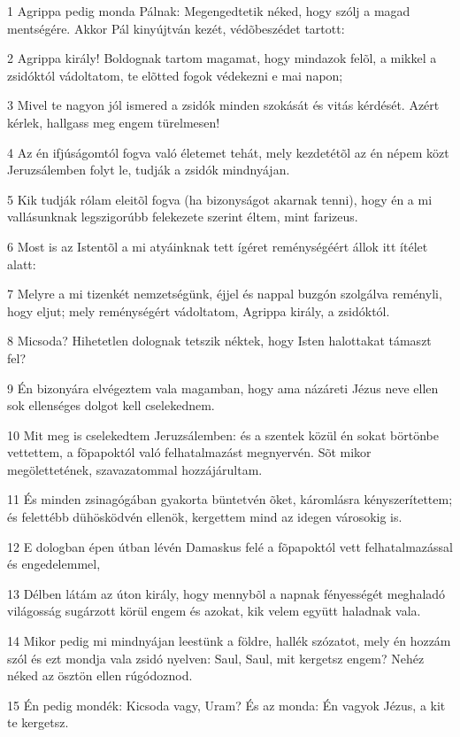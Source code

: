\par 1 Agrippa pedig monda Pálnak: Megengedtetik néked, hogy szólj a magad mentségére. Akkor Pál kinyújtván kezét, védõbeszédet tartott:
\par 2 Agrippa király! Boldognak tartom magamat, hogy mindazok felõl, a mikkel a zsidóktól vádoltatom, te elõtted fogok védekezni e mai napon;
\par 3 Mivel te nagyon jól ismered a zsidók minden szokását és vitás kérdését. Azért kérlek, hallgass meg engem türelmesen!
\par 4 Az én ifjúságomtól fogva való életemet tehát, mely kezdetétõl az én népem közt Jeruzsálemben folyt le, tudják a zsidók mindnyájan.
\par 5 Kik tudják rólam eleitõl fogva (ha bizonyságot akarnak tenni), hogy én a mi vallásunknak legszigorúbb felekezete szerint éltem, mint farizeus.
\par 6 Most is az Istentõl a mi atyáinknak tett ígéret reménységéért állok itt ítélet alatt:
\par 7 Melyre a mi tizenkét nemzetségünk, éjjel és nappal buzgón szolgálva reményli, hogy eljut; mely reménységért vádoltatom, Agrippa király, a zsidóktól.
\par 8 Micsoda? Hihetetlen dolognak tetszik néktek, hogy Isten halottakat támaszt fel?
\par 9 Én bizonyára elvégeztem vala magamban, hogy ama názáreti Jézus neve ellen sok ellenséges dolgot kell cselekednem.
\par 10 Mit meg is cselekedtem Jeruzsálemben: és a szentek közül én sokat börtönbe vettettem, a fõpapoktól való felhatalmazást megnyervén. Sõt mikor megölettetének,  szavazatommal hozzájárultam.
\par 11 És minden zsinagógában gyakorta büntetvén õket, káromlásra kényszerítettem; és felettébb dühösködvén ellenök, kergettem mind az idegen városokig is.
\par 12 E dologban épen útban lévén Damaskus felé a fõpapoktól vett felhatalmazással és engedelemmel,
\par 13 Délben látám az úton király, hogy mennybõl a napnak fényességét meghaladó világosság sugárzott körül engem és azokat, kik velem együtt haladnak vala.
\par 14 Mikor pedig mi mindnyájan leestünk a földre, hallék szózatot, mely én hozzám szól és ezt mondja vala zsidó nyelven: Saul, Saul, mit kergetsz engem? Nehéz néked az ösztön ellen rúgódoznod.
\par 15 Én pedig mondék: Kicsoda vagy, Uram? És az monda: Én vagyok Jézus, a kit te kergetsz.
